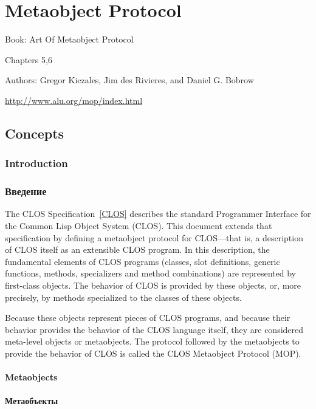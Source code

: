 \clearpage\def\pagestatus{FINAL PROOF}

\chapter{Metaobject Protocol}
\label{METAOBJECT-PROTOCOL}

Book: Art Of Metaobject Protocol

Chapters 5,6

Authors: Gregor Kiczales, Jim des Rivieres, and Daniel G. Bobrow

\href{http://www.alu.org/mop/index.html}{http://www.alu.org/mop/index.html}

\section{Concepts}

\subsection{Introduction}
\subsection{Введение}


The CLOS Specification~\ref{CLOS} describes the standard Programmer Interface for the
Common Lisp Object System (CLOS). This document extends that specification by
defining a metaobject protocol for CLOS---that is, a description of CLOS itself
as an extensible CLOS program. In this description, the fundamental elements of
CLOS programs (classes, slot definitions, generic functions, methods,
specializers and method combinations) are represented by first-class
objects. The behavior of CLOS is provided by these objects, or, more precisely,
by methods specialized to the classes of these objects.

Because these objects represent pieces of CLOS programs, and because their
behavior provides the behavior of the CLOS language itself, they are considered
meta-level objects or metaobjects. The protocol followed by the metaobjects to
provide the behavior of CLOS is called the CLOS Metaobject Protocol (MOP). 

\subsubsection{Metaobjects}

\subsubsection{Метаобъекты}

